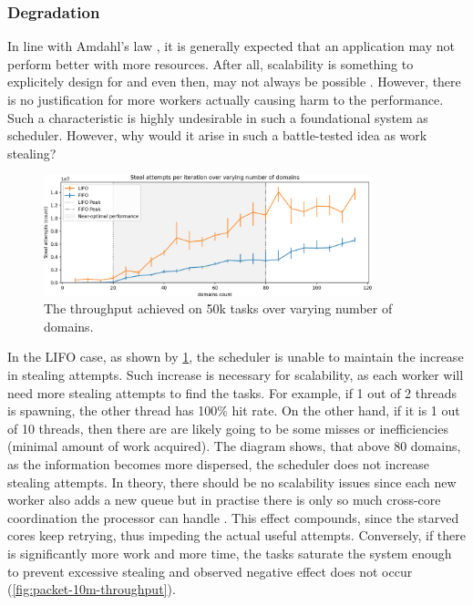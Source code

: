 \documentclass[12pt,a4paper,twoside]{report}
\begin{document}
\subsubsection{Degradation}
\label{section:degradation}
In line with Amdahl's law \cite{amdahl}, it is generally expected that an application may not perform better with more resources. After all, scalability is something to explicitely design for and even then, may not always be possible . However, there is no justification for more workers actually causing harm to the performance. Such a characteristic is highly undesirable in such a foundational system as scheduler. However, why would it arise in such a battle-tested idea as work stealing? 

\begin{figure} 
     \centering
     \includegraphics[width=0.85\textwidth]{eval/packet-basic-with-steal-counts2.png}
     \caption{The throughput achieved on 50k tasks over varying number of domains.}
    \label{fig:packet-with-steal-counts}
\end{figure}

In the LIFO case, as shown by \ref{fig:packet-with-steal-counts}, the scheduler is unable to maintain the increase in stealing attempts. Such increase is necessary for scalability, as each worker will need more stealing attempts to find the tasks. For example, if 1 out of 2 threads is spawning, the other thread has 100\% hit rate. On the other hand, if it is 1 out of 10 threads, then there are are likely going to be some misses or inefficiencies (minimal amount of work acquired). The diagram shows, that above 80 domains, as the information becomes more dispersed, the scheduler does not increase stealing attempts. In theory, there should be no scalability issues since each new worker also adds a new queue but in practise there is only so much cross-core coordination the processor can handle . This effect compounds, since the starved cores keep retrying, thus impeding the actual useful attempts. Conversely, if there is significantly more work and more time, the tasks saturate the system enough to prevent excessive stealing and observed negative effect does not occur (\ref{fig:packet-10m-throughput}). 
\end{document}

